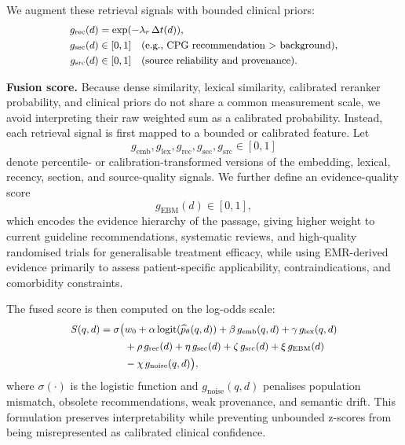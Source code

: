 \documentclass[conference]{IEEEtran}
\begin{document}
We augment these retrieval signals with bounded clinical priors:
\begin{equation}
\small
\begin{aligned}
    g_{\mathrm{rec}}(d) &= \exp(-\lambda_r\,\Delta t(d)), \\
    g_{\mathrm{sec}}(d) &\in [0,1] \quad \text{(e.g., CPG recommendation $>$ background)},\\
    g_{\mathrm{src}}(d) &\in [0,1] \quad \text{(source reliability and provenance)}.
\end{aligned}
\end{equation}

\textbf{Fusion score.}
Because dense similarity, lexical similarity, calibrated reranker probability, and clinical priors do not share a common measurement scale, we avoid interpreting their raw weighted sum as a calibrated probability. Instead, each retrieval signal is first mapped to a bounded or calibrated feature. Let
\[
g_{\mathrm{emb}},g_{\mathrm{lex}},g_{\mathrm{rec}},g_{\mathrm{sec}},g_{\mathrm{src}}\in[0,1]
\]
denote percentile- or calibration-transformed versions of the embedding, lexical, recency, section, and source-quality signals. We further define an evidence-quality score
\[
g_{\mathrm{EBM}}(d)\in[0,1],
\]
which encodes the evidence hierarchy of the passage, giving higher weight to current guideline recommendations, systematic reviews, and high-quality randomised trials for generalisable treatment efficacy, while using EMR-derived evidence primarily to assess patient-specific applicability, contraindications, and comorbidity constraints.

The fused score is then computed on the log-odds scale:
\begin{equation}
\label{eq:fusion}
\small
\begin{aligned}
S(q,d)
=
\sigma\big(&
w_0
+\alpha\,\mathrm{logit}(\widehat{p}_\theta(q,d))
+\beta\,g_{\mathrm{emb}}(q,d)
+\gamma\,g_{\mathrm{lex}}(q,d)
\\
&+\rho\,g_{\mathrm{rec}}(d)
+\eta\,g_{\mathrm{sec}}(d)
+\zeta\,g_{\mathrm{src}}(d)
+\xi\,g_{\mathrm{EBM}}(d) 
\\
&-\chi\,g_{\mathrm{noise}}(q,d)
\big),
\end{aligned}
\end{equation}
where $\sigma(\cdot)$ is the logistic function and $g_{\mathrm{noise}}(q,d)$ penalises population mismatch, obsolete recommendations, weak provenance, and semantic drift. This formulation preserves interpretability while preventing unbounded z-scores from being misrepresented as calibrated clinical confidence.
\end{document}
